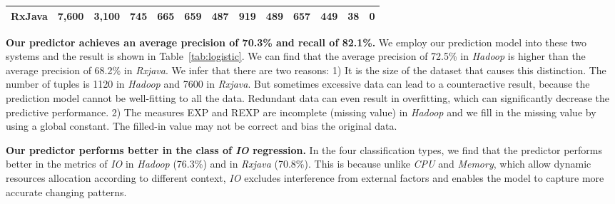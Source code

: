 \begin{table*}[tbh]
\begin{tabular}{|c|r|r|c|r|c|r|c|r|c|r|c|r|}
		RxJava            & 7,600                                                                           & 3,100                                                                  & \multicolumn{1}{r|}{745}                                & 665                                                                           & \multicolumn{1}{r|}{659}                                & 487                                                                           & \multicolumn{1}{r|}{919}                                & 489                                                                           & \multicolumn{1}{r|}{657}                                & 449                                                                           & \multicolumn{1}{r|}{38}                                 & 0                                                                             \\ \hline
	\end{tabular}
\end{table*}

 \textbf{Our predictor achieves an average precision of 70.3\% and recall of 82.1\%.} We employ our prediction model into these two systems and the result is shown in Table~\ref{tab:logistic}. We can find that the average precision of 72.5\% in \emph{Hadoop} is higher than the average precision of 68.2\% in \emph{Rxjava}. We infer that there are two reasons: 1) It is the size of the dataset that causes this distinction. The number of tuples is 1120 in \emph{Hadoop} and 7600 in \emph{Rxjava}. But sometimes excessive data can lead to a counteractive result, because the prediction model cannot be well-fitting to all the data. Redundant data can even result in overfitting, which can significantly decrease the predictive performance.  2) The measures EXP and REXP  are incomplete (missing value) in \emph{Hadoop} and we fill in the missing value by using a global constant. The filled-in value may not be correct and bias the original data.
 
 \textbf{Our predictor performs better in the class of \emph{IO} regression.} In the four classification types, we find that the predictor performs better in the metrics of \emph{IO} in \emph{Hadoop} (76.3\%) and in  \emph{Rxjava} (70.8\%). This is because unlike \emph{CPU} and \emph{Memory}, which allow dynamic resources allocation according to different context, \emph{IO} excludes interference from external factors and enables the model to capture more accurate changing patterns.

